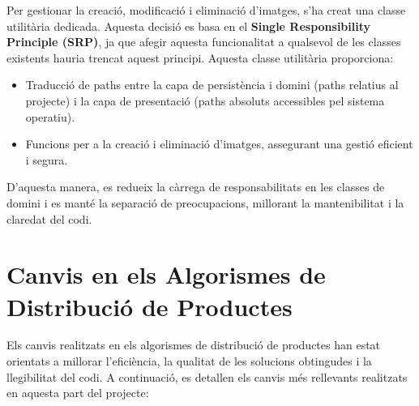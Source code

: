 \documentclass[a4paper,12pt]{report}
\begin{document}
Per gestionar la creació, modificació i eliminació d'imatges, s'ha creat una classe utilitària dedicada. Aquesta decisió es basa en el \textbf{Single Responsibility Principle (SRP)}, ja que afegir aquesta funcionalitat a qualsevol de les classes existents hauria trencat aquest principi. Aquesta classe utilitària proporciona:
\begin{itemize}
	\item Traducció de paths entre la capa de persistència i domini (paths relatius al projecte) i la capa de presentació (paths absoluts accessibles pel sistema operatiu).
	\item Funcions per a la creació i eliminació d'imatges, assegurant una gestió eficient i segura.
\end{itemize}
D'aquesta manera, es redueix la càrrega de responsabilitats en les classes de domini i es manté la separació de preocupacions, millorant la mantenibilitat i la claredat del codi.

\newpage
\section {Canvis en els Algorismes de Distribució de Productes}

Els canvis realitzats en els algorismes de distribució de productes han estat orientats a millorar l'eficiència, la qualitat de les solucions obtingudes i la llegibilitat del codi. A continuació, es detallen els canvis més rellevants realitzats en aquesta part del projecte:
\end{document}
